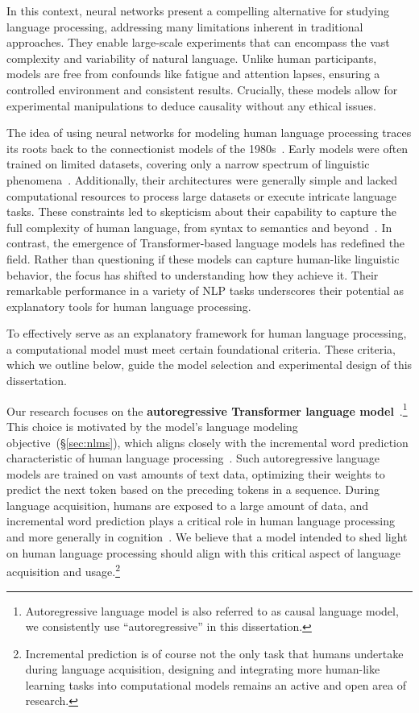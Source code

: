 In this context, neural networks present a compelling alternative for studying language processing, addressing many limitations inherent in traditional approaches. They enable large-scale experiments that can encompass the vast complexity and variability of natural language. Unlike human participants, models are free from confounds like fatigue and attention lapses, ensuring a controlled environment and consistent results. Crucially, these models allow for experimental manipulations to deduce causality without any ethical issues.

The idea of using neural networks for modeling human language processing traces its roots back to the connectionist models of the 1980s~\citep{rumelhart1986parallel}. 
Early models were often trained on limited datasets, covering only a narrow spectrum of linguistic phenomena~\citep{elman89representation}. Additionally, their architectures were generally simple and lacked computational resources to process large datasets or execute intricate language tasks. These constraints led to skepticism about their capability to capture the full complexity of human language, from syntax to semantics and beyond~\citep{pinker1988language,fodor1988connectionism,marcus1998rethinking}. In contrast, the emergence of Transformer-based language models has redefined the field. Rather than questioning if these models can capture human-like linguistic behavior, the focus has shifted to understanding how they achieve it. Their remarkable performance in a variety of \ac{NLP} tasks underscores their potential as explanatory tools for human language processing.


To effectively serve as an explanatory framework for human language processing, a computational model must meet certain foundational criteria.
These criteria, which we outline below, guide the model selection and experimental design of this dissertation.

Our research focuses on the \textbf{autoregressive Transformer language model}~\citep{NIPS2017_3f5ee243}.\footnote{Autoregressive language model is also referred to as causal language model, we consistently use ``autoregressive'' in this dissertation.} This choice is motivated by the model's language modeling objective~(\S\ref{sec:nlms}), which aligns closely with the incremental word prediction characteristic of human language processing~\citep{hale2001probabilistic,lappin2022algebraic}. Such autoregressive language models are trained on vast amounts of text data, optimizing their weights to predict the next token based on the preceding tokens in a sequence. During language acquisition, humans are exposed to a large amount of data, and incremental word prediction plays a critical role in human language processing~\citep{landauer1997solution,hale2001probabilistic,kuperberg2016we,levy2008expectation} and more generally in cognition~\citep{bar2007proactive,clark2015surfing}. We believe that a model intended to shed light on human language processing should align with this critical aspect of language acquisition and usage.\footnote{ Incremental prediction is of course not the only task that humans undertake during language acquisition, designing and integrating more human-like learning tasks into computational models remains an active and open area of research.}

